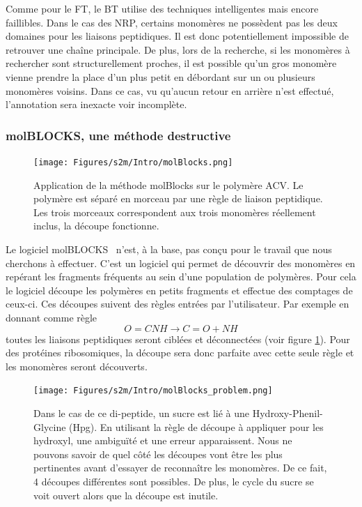 Comme pour le FT, le BT utilise des techniques intelligentes mais encore faillibles.
Dans le cas des NRP, certains monomères ne possèdent pas les deux domaines pour les liaisons peptidiques.
Il est donc potentiellement impossible de retrouver une chaîne principale.
De plus, lors de la recherche, si les monomères à rechercher sont structurellement proches, il est possible qu'un gros monomère vienne prendre la place d'un plus petit en débordant sur un ou plusieurs monomères voisins.
Dans ce cas, vu qu'aucun retour en arrière n'est effectué, l'annotation sera inexacte voir incomplète.


\subsubsection{molBLOCKS, une méthode destructive}

\begin{figure}[!ht]
  \begin{center}
    \texttt{[image: Figures/s2m/Intro/molBlocks.png]}
    \caption{\label{molBlocks}Application de la méthode molBlocks sur le polymère ACV.
    Le polymère est séparé en morceau par une règle de liaison peptidique.
    Les trois morceaux correspondent aux trois monomères réellement inclus, la découpe fonctionne.}
  \end{center}
\end{figure}

Le logiciel molBLOCKS~\cite{ghersi_molblocks:_2014} n'est, à la base, pas conçu pour le travail que nous cherchons à effectuer.
C'est un logiciel qui permet de découvrir des monomères en repérant les fragments fréquents au sein d'une population de polymères.
Pour cela le logiciel découpe les polymères en petits fragments et effectue des comptages de ceux-ci.
Ces découpes suivent des règles entrées par l'utilisateur.
Par exemple en donnant comme règle
\begin{equation}
  O=CNH \longrightarrow C=O + NH
\end{equation}
toutes les liaisons peptidiques seront ciblées et déconnectées (voir figure \ref{molBlocks}).
Pour des protéines ribosomiques, la découpe sera donc parfaite avec cette seule règle et les monomères seront découverts.

\begin{figure}[!ht]
  \begin{center}
    \texttt{[image: Figures/s2m/Intro/molBlocks\_problem.png]}
    \caption{\label{molBlocks_problem}Dans le cas de ce di-peptide, un sucre est lié à une Hydroxy-Phenil-Glycine (Hpg).
    En utilisant la règle de découpe à appliquer pour les hydroxyl, une ambiguïté et une erreur apparaissent.
    Nous ne pouvons savoir de quel côté les découpes vont être les plus pertinentes avant d'essayer de reconnaître les monomères.
    De ce fait, 4 découpes différentes sont possibles.
    De plus, le cycle du sucre se voit ouvert alors que la découpe est inutile.}
  \end{center}
\end{figure}

